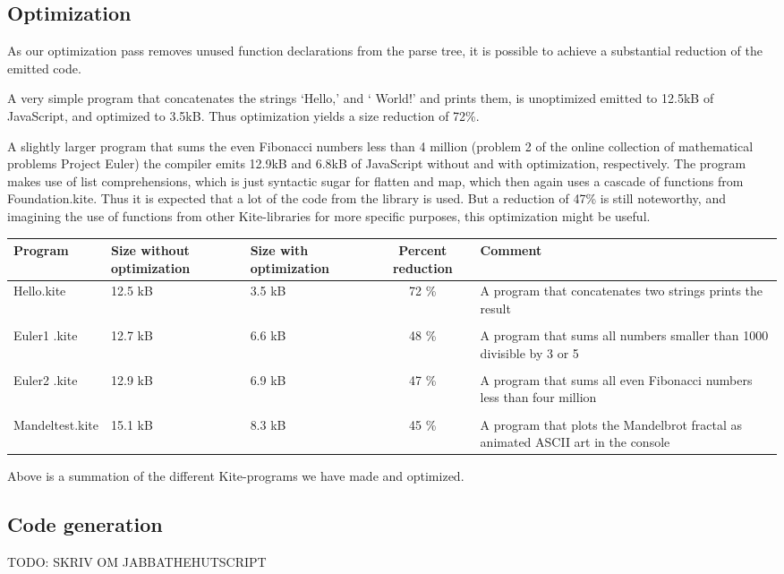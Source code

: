 \subsection{Optimization}
As our optimization pass removes unused function declarations from the parse tree, it is possible to achieve a substantial reduction of the emitted code.

A very simple program that concatenates the strings `Hello,' and ` World!' and prints them, is unoptimized emitted to 12.5kB of JavaScript, and optimized to 3.5kB. Thus optimization yields a size reduction of 72\%.

A slightly larger program that sums the even Fibonacci numbers less than 4 million (problem 2 of the online collection of mathematical problems Project Euler\cite{euler}) the compiler emits 12.9kB and 6.8kB of JavaScript without and with optimization, respectively. The program makes use of list comprehensions, which is just syntactic sugar for flatten and map, which then again uses a cascade of functions from Foundation.kite. Thus it is expected that a lot of the code from the library is used. But a reduction of 47\% is still noteworthy, and imagining the use of functions from other Kite-libraries for more specific purposes, this optimization might be useful.

\begin{center}
  \begin{tabulary}{0.9\textwidth}{|L| L |L| C | L | }
    \hline
    Program & Size without optimization & Size with optimization & Percent reduction & Comment \\
    \hline
    Hello.kite       & 12.5 kB & 3.5 kB & 72 \% & A program that concatenates two strings prints the result \\
    & & & & \\
    Euler1 .kite       & 12.7 kB & 6.6 kB & 48 \% & A program that sums all numbers smaller than 1000 divisible by 3 or 5 \\
    & & & & \\
    Euler2 .kite       & 12.9 kB & 6.9 kB & 47 \% & A program that sums all even Fibonacci numbers less than four million \\
    & & & & \\
    Mandeltest.kite       & 15.1 kB & 8.3 kB & 45 \% & A program that plots the Mandelbrot fractal as animated ASCII art in the console\\
    \hline
  \end{tabulary}

  Above is a summation of the different Kite-programs we have made and optimized.
\end{center}

\subsection{Code generation}
TODO: SKRIV OM JABBATHEHUTSCRIPT
